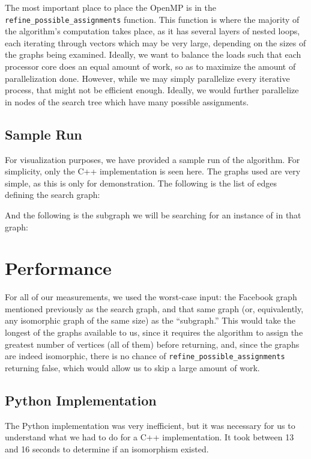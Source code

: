 \documentclass{article}
\begin{document}
  The most important place to place the OpenMP is in the \texttt{refine\_possible\_assignments} function. This function is where the majority of the algorithm's computation takes place, as it has several layers of nested loops, each iterating through vectors which may be very large, depending on the sizes of the graphs being examined. Ideally, we want to balance the loads such that each processor core does an equal amount of work, so as to maximize the amount of parallelization done. However, while we may simply parallelize every iterative process, that might not be efficient enough. Ideally, we would further parallelize in nodes of the search tree which have many possible assignments.

  \subsection{Sample Run}

  For visualization purposes, we have provided a sample run of the algorithm. For simplicity, only the C++ implementation is seen here. The graphs used are very simple, as this is only for demonstration. The following is the list of edges defining the search graph:

  

  And the following is the subgraph we will be searching for an instance of in that graph:

  
\section{Performance}

For all of our measurements, we used the worst-case input: the Facebook graph mentioned previously as the search graph, and that same graph (or, equivalently, any isomorphic graph of the same size) as the ``subgraph.'' This would take the longest of the graphs available to us, since it requires the algorithm to assign the greatest number of vertices (all of them) before returning, and, since the graphs are indeed isomorphic, there is no chance of \texttt{refine\_possible\_assignments} returning false, which would allow us to skip a large amount of work.

  \subsection{Python Implementation}
  The Python implementation was very inefficient, but it was necessary for us to understand what we had to do for a C++ implementation. It took between 13 and 16 seconds to determine if an isomorphism existed.
\end{document}
